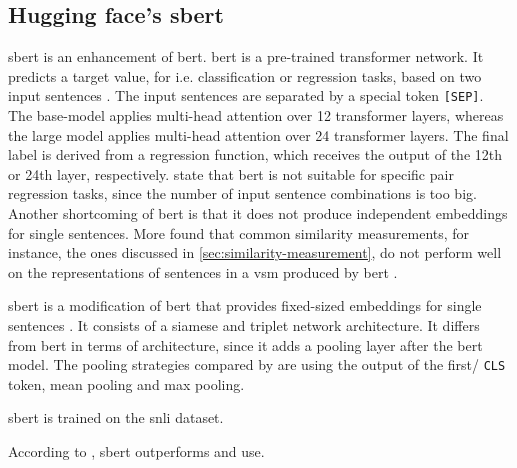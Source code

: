 \subsection{Hugging face's \acs{sbert}}\label{subsec:hf-sent-ransformers}

\ac{sbert} is an enhancement of \ac{bert}.
\ac{bert} is a pre-trained transformer network.
It predicts a target value, for i.e. classification or regression tasks, based on two input sentences \cite{HfsentTrans2019}.
The input sentences are separated by a special token \texttt{[SEP]}.
The base-model applies multi-head attention over 12 transformer layers, whereas the large model applies multi-head attention over 24 transformer layers.
The final label is derived from a regression function, which receives the output of the 12th or 24th layer, respectively.
\citeauthor{HfsentTrans2019} state that \ac{bert} is not suitable for specific pair regression tasks, 
since the number of input sentence combinations is too big.
Another shortcoming of \ac{bert} is that it does not produce independent embeddings for single sentences.
More \citeauthor{HfsentTrans2019} found that common similarity measurements, for instance, the ones discussed in \autoref{sec:similarity-measurement}, 
do not perform well on the representations of sentences in a \ac{vsm} produced by \ac{bert} \cite{HfsentTrans2019}.

\ac{sbert} is a modification of \ac{bert} that provides fixed-sized embeddings for single sentences \cite{HfsentTrans2019}.
It consists of a siamese and triplet network architecture.
It differs from \ac{bert} in terms of architecture, since it adds a pooling layer after the \ac{bert} model.
The pooling strategies compared by \citeauthor{HfsentTrans2019} are using the output of the first/ \texttt{CLS} token, mean pooling and max pooling.

\ac{sbert} is trained on the \ac{snli} dataset.

According to \citeauthor{HfsentTrans2019}, \ac{sbert} outperforms \infersent{} and \ac{use}.
